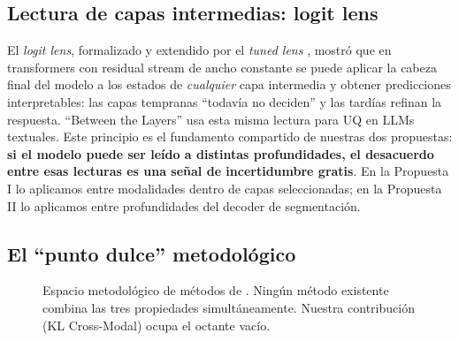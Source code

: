 \documentclass[12pt,a4paper]{article}
\newcommand{\UQ}{\text{UQ}}
\begin{document}
\subsection{Lectura de capas intermedias: logit lens}

El \textit{logit lens}, formalizado y extendido por el \textit{tuned lens} \citep{belrose2023tunedlens}, mostró que en transformers con residual stream de ancho constante se puede aplicar la cabeza final del modelo a los estados de \emph{cualquier} capa intermedia y obtener predicciones interpretables: las capas tempranas ``todavía no deciden'' y las tardías refinan la respuesta.
``Between the Layers'' \citep{badash2026between} usa esta misma lectura para UQ en LLMs textuales.
Este principio es el fundamento compartido de nuestras dos propuestas: \textbf{si el modelo puede ser leído a distintas profundidades, el desacuerdo entre esas lecturas es una señal de incertidumbre gratis}.
En la Propuesta I lo aplicamos entre modalidades dentro de capas seleccionadas; en la Propuesta II lo aplicamos entre profundidades del decoder de segmentación.

\subsection{El ``punto dulce'' metodológico}

\begin{figure}[H]
\centering
{}
\caption{Espacio metodológico de métodos de \UQ.
Ningún método existente combina las tres propiedades simultáneamente.
Nuestra contribución (KL Cross-Modal) ocupa el octante vacío.}
\label{fig:espacio-metodologico}
\end{figure}
\end{document}
